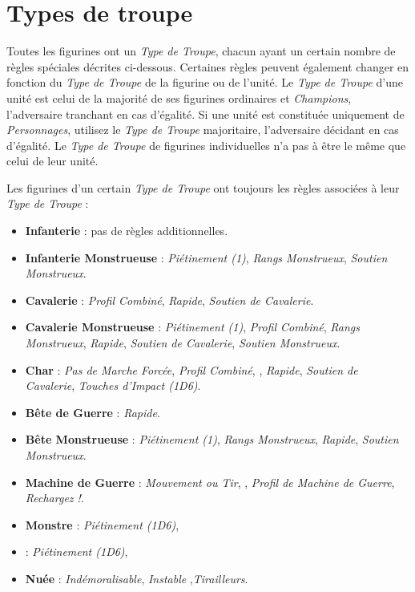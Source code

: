 
\part{Types de troupe}
\label{types_de_troupe}

Toutes les figurines ont un \emph{Type de Troupe}, chacun ayant un certain nombre de règles spéciales décrites ci-dessous. Certaines règles peuvent également changer en fonction du \emph{Type de Troupe} de la figurine ou de l'unité. Le \emph{Type de Troupe} d'une unité est celui de la majorité de ses figurines ordinaires et \emph{Champions}, l'adversaire tranchant en cas d'égalité. Si une unité est constituée uniquement de \emph{Personnages}, utilisez le \emph{Type de Troupe} majoritaire, l'adversaire décidant en cas d'égalité. Le \emph{Type de Troupe} de figurines individuelles n'a pas à être le même que celui de leur unité.

Les figurines d'un certain \emph{Type de Troupe} ont toujours les règles associées à leur \emph{Type de Troupe} :
\begin{itemize}[label={-}, itemsep=0.2cm]
\item \textbf{Infanterie} : pas de règles additionnelles.
\item \textbf{Infanterie Monstrueuse} : \emph{Piétinement (1)}, \emph{Rangs Monstrueux}, \emph{Soutien Monstrueux}.
\item \textbf{Cavalerie} : \emph{Profil Combiné}, \emph{Rapide}, \emph{Soutien de Cavalerie}.
\item \textbf{Cavalerie Monstrueuse} : \emph{Piétinement (1)}, \emph{Profil Combiné}, \emph{Rangs Monstrueux}, \emph{Rapide}, \emph{Soutien de Cavalerie}, \emph{Soutien Monstrueux}.
\item \textbf{Char} :  \emph{Pas de Marche Forcée}, \emph{Profil Combiné}, \emph{}, \emph{Rapide}, \emph{Soutien de Cavalerie}, \emph{Touches d'Impact (1D6)}.
\item \textbf{Bête de Guerre} : \emph{Rapide}.
\item \textbf{Bête Monstrueuse} : \emph{Piétinement (1)}, \emph{Rangs Monstrueux}, \emph{Rapide}, \emph{Soutien Monstrueux}.
\item \textbf{Machine de Guerre} : \emph{Mouvement ou Tir}, \emph{}, \emph{Profil de Machine de Guerre}, \emph{Rechargez !}.
\item \textbf{Monstre} :  \emph{Piétinement (1D6)}, 
\item \textbf{} :   \emph{Piétinement (1D6)}, 
\item \textbf{Nuée} : \emph{Indémoralisable}, \emph{Instable} ,\emph{Tirailleurs}.
\end{itemize}

